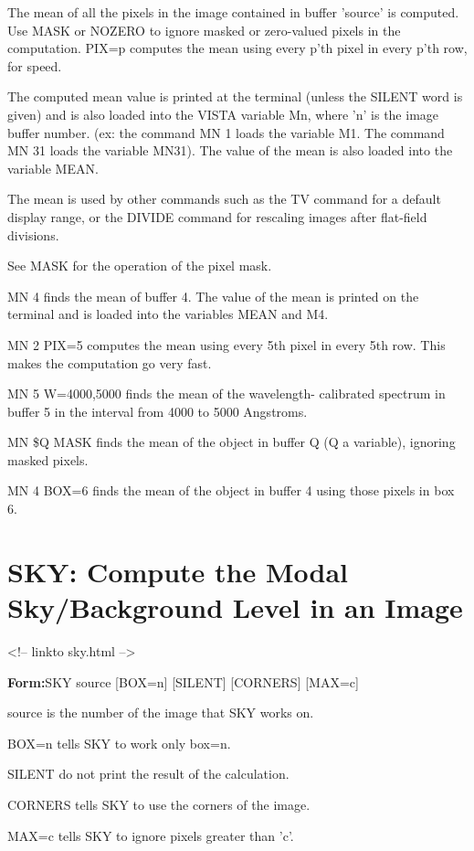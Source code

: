 The mean of all the pixels in the image contained in buffer 'source' is
computed.  Use MASK or NOZERO to ignore masked or zero-valued pixels in the
computation.  PIX=p computes the mean using every p'th pixel in every p'th
row, for speed.

The computed mean value is printed at the terminal (unless the SILENT word
is given) and is also loaded into the VISTA variable Mn, where 'n' is the
image buffer number. (ex: the command MN 1 loads the variable M1.  The
command MN 31 loads the variable MN31).  The value of the mean is also
loaded into the variable MEAN.

The mean is used by other commands such as the TV command for a default
display range, or the DIVIDE command for rescaling images after flat-field
divisions.

See MASK for the operation of the pixel mask.

\begin{example}
  \item[MN 4\hfill]{finds the mean of buffer 4.  The
  value of the mean is printed on the terminal and is loaded into the 
  variables MEAN and M4.}
  \item[MN 2 PIX=5\hfill]{computes the mean using every 5th 
  pixel in every 5th row.  This makes the computation go very fast.}
  \item[MN 5 W=4000,5000\hfill]{finds the mean of the wavelength-
  calibrated spectrum in buffer 5 in the interval from 4000 to 5000 Angstroms.}
  \item[MN \$Q MASK\hfill]{finds the mean of the object in buffer
  Q (Q a variable), ignoring masked pixels.}
  \item[MN 4 BOX=6\hfill]{finds the mean of the object in
  buffer 4 using those pixels in box 6.}
\end{example}

\section{SKY: Compute the Modal Sky/Background Level in an Image}
\begin{rawhtml}
<!-- linkto sky.html -->
\end{rawhtml}
\begin{command}
  \item[\textbf{Form:}SKY source {[BOX=n]} {[SILENT]} {[CORNERS]}
       {[MAX=c]}\hfill]{}
  \item[source]{is the number of the image that SKY works on.}
  \item[BOX=n]{tells SKY to work only box=n.}
  \item[SILENT]{do not print the result of the calculation.}
  \item[CORNERS]{tells SKY to use the corners of the image.}
  \item[MAX=c]{tells SKY to ignore pixels greater than 'c'.}
\end{command}

